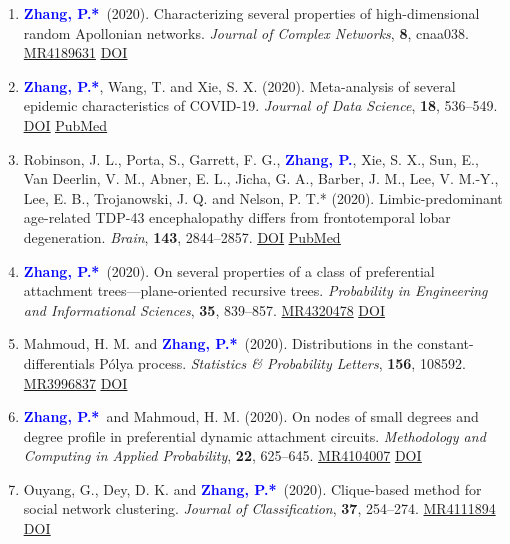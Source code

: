 \documentclass{res}
\def\MR#1{\href{http://www.ams.org/mathscinet-getitem?mr=#1}{MR#1}}
\newcommand{\PZ}{\textbf{\textcolor{blue}{Zhang, P.*}}}
\newcommand{\PZnot}{\textbf{\textcolor{blue}{Zhang, P.}}}
\begin{document}
\begin{resume}
\begin{enumerate}
	\item \PZ\ (2020). Characterizing several properties of 
	high-dimensional random Apollonian networks. {\em 
	Journal of Complex Networks}, {\bf 8}, cnaa038. \MR{4189631}
	\href{https://doi.org/10.1093/comnet/cnaa038}
	{\underline{DOI}}
	
	\item \PZ, {\sc Wang, T.} and {\sc Xie, S. X.} 
	(2020). Meta-analysis of several epidemic characteristics of 
	COVID-19. {\em Journal of Data Science}, {\bf 18}, 536--549. 
	\href{https://doi.org/10.6339/JDS.202007_18(3).0019}
	{\underline{DOI}}
	\href{https://pubmed.ncbi.nlm.nih.gov/33088292}
	{\underline{PubMed}}
	
	\item {\sc Robinson, J. L., Porta, S., Garrett, F. G.}, 
	\PZnot, {\sc Xie, S. X., Sun, E., 
	Van Deerlin, V. M., Abner, 
	E. L., Jicha, G. A., Barber, J. M., Lee, V. M.-Y., Lee, E. B., 
	Trojanowski, J. Q.} and {\sc Nelson, P. T.*} (2020). 
	Limbic-predominant age-related TDP-43 encephalopathy differs 
	from frontotemporal lobar degeneration. {\em Brain}, {\bf 143}, 
	2844--2857. 
	\href{https://doi.org/10.1093/brain/awaa219}
	{\underline{DOI}}
	\href{https://pubmed.ncbi.nlm.nih.gov/32830216}
	{\underline{PubMed}}
		
	\item \PZ\ (2020). On several properties of a 
	class of preferential attachment trees---plane-oriented 
	recursive trees. {\em Probability in Engineering and 
	Informational Sciences}, {\bf 35}, 839--857. \MR{4320478}
	\href{https://doi.org/10.1017/S0269964820000261}
	{\underline{DOI}}
	
	\item {\sc Mahmoud, H. M.} and \PZ\ (2020). 
	Distributions in the constant-differentials P\'{o}lya process. 
	{\em Statistics \& Probability Letters}, \textbf{156}, 108592. 
	\MR{3996837}
	\href{https://doi.org/10.1016/j.spl.2019.108592}
	{\underline{DOI}}
		
	\item \PZ\ and {\sc Mahmoud, H. M.} (2020). On 
	nodes of small degrees and degree profile in preferential 
	dynamic attachment circuits. {\em Methodology and Computing in 
	Applied Probability}, \textbf{22}, 625--645. \MR{4104007}
	\href{https://doi.org/10.1007/s11009-019-09726-4}
	{\underline{DOI}}

	\item {\sc Ouyang, G., Dey, D. K.} and \PZ\ (2020). 
	Clique-based method for social network clustering. {\em Journal 
	of 
	Classification}, \textbf{37}, 254--274. \MR{4111894}
	\href{https://doi.org/10.1007/s00357-019-9310-5}
	{\underline{DOI}}
	

\end{enumerate}
\end{resume}
\end{document}

